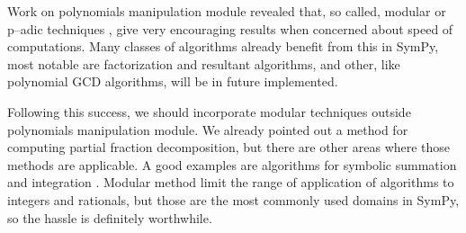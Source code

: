 Work on polynomials manipulation module revealed that, so called, modular or p--adic techniques
\cite{Yun1976padic}, give very encouraging results when concerned about speed of computations. Many
classes of algorithms already benefit from this in SymPy, most notable are factorization and
resultant algorithms, and other, like polynomial GCD algorithms, will be in future implemented.

Following this success, we should incorporate modular techniques outside polynomials manipulation
module. We already pointed out a method for computing partial fraction decomposition, but there
are other areas where those methods are applicable. A good examples are algorithms for symbolic
summation and integration \cite{Gerhard2006modular}. Modular method limit the range of application
of algorithms to integers and rationals, but those are the most commonly used domains in SymPy,
so the hassle is definitely worthwhile.

